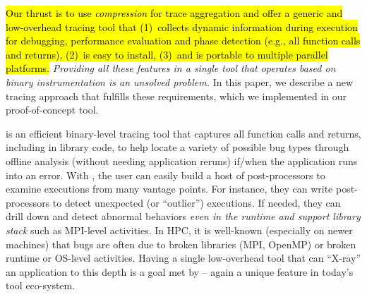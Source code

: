 %
\hl{Our thrust is to use \textit{compression} for trace aggregation and offer 
a generic and low-overhead tracing tool that 
(1)~collects dynamic information during execution for debugging, performance evaluation and phase detection (e.g., all function
calls and returns), 
(2)~is easy to install, 
(3)~and is portable to multiple parallel platforms.
}
%
{\em Providing all these features in a single tool
that operates based on binary instrumentation
is an unsolved problem.}
%
In this paper, we describe a new tracing approach that fulfills these requirements, which we implemented in our proof-of-concept \parlot tool.


\parlot is an efficient binary-level tracing tool that captures all function calls and returns, including in library code, 
to help locate a variety of possible bug types through 
offline analysis (without needing application reruns) 
if/when the application runs into an error. 
%
With \parlot, the user can easily build a host of post-processors to examine
executions from many vantage points.
%
For instance, they can write post-processors
to detect unexpected (or ``outlier'') executions.
%
If needed, they can 
drill down and detect abnormal behaviors {\em even in the runtime and
support library stack} such as MPI-level activities.
%
In HPC, it is well-known (especially on newer machines) that bugs are often due to
broken libraries (MPI, OpenMP) or broken runtime or OS-level activities.
%
Having a single low-overhead tool that can ``X-ray'' an application to this depth is a goal met by \parlot -- again a unique feature in today's tool eco-system.

